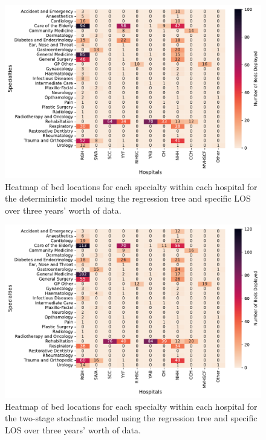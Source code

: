 \documentclass[thesis.tex]{subfiles}
\begin{document}
\begin{figure}[h!]
    \centering
    \includegraphics[scale=0.55]{Figures - Heatmaps/Fig15.pdf}
  \caption{Heatmap of bed locations for each specialty within each hospital for the deterministic model using the regression tree and specific LOS over three years' worth of data.}
    \label{fig:app10a}
\end{figure}
\begin{figure}[h!]
    \centering
    \includegraphics[scale=0.55]{Figures - Heatmaps/Fig16.pdf}
  \caption{Heatmap of bed locations for each specialty within each hospital for the two-stage stochastic model using the regression tree and specific LOS over three years' worth of data.}
    \label{fig:app10b}
\end{figure}
\end{document}
